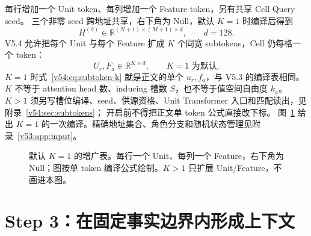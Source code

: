 \documentclass[11pt,UTF8,fontset=fandol]{ctexart}
\numberwithin{equation}{section}
\theoremstyle{definition}
\newcommand{\R}{\mathbb R}
\begin{document}
每行增加一个 Unit token、每列增加一个 Feature token，另有共享 Cell Query seed。
三个非零 seed 跨地址共享，右下角为 Null，默认 $K=1$ 时编译后得到
\begin{equation}
 \boxed{H^{(0)}\in\R^{(N+1)\times(M+1)\times d},\qquad d=128.}
 \label{v53:eq:table-shape}
\end{equation}
V5.4 允许把每个 Unit 与每个 Feature 扩成 $K$ 个同宽 subtokens，Cell 仍每格一个 token：
\begin{equation}
 U_r,F_a\in\R^{K\times d},\qquad K=1\text{ 为默认}.
 \label{v54:eq:subtoken-k}
\end{equation}
$K=1$ 时式~\eqref{v54:eq:subtoken-k} 就是正文的单个 $u_r,f_a$，与 V5.3 的编译表相同。
$K$ 不等于 attention head 数、inducing 槽数 $S$，也不等于值空间自由度 $k_a$。
$K>1$ 须另写槽位编译、seed、供源资格、Unit Transformer 入口和匹配读出，见附录~\ref{v54:sec:subtokens}；
开启前不得把正文单 token 公式直接改下标。
图~\ref{fig:compiler} 给出 $K=1$ 的一次编译。精确地址集合、角色分支和随机状态管理见附录~\ref{v53:app:input}。

\begin{figure}[htbp]\centering
{}
\caption{默认 $K=1$ 的增广表。每行一个 Unit、每列一个 Feature，右下角为 Null；图按单 token 编译公式绘制。$K>1$ 只扩展 Unit/Feature，不画进本图。}
\label{fig:compiler}\end{figure}



\section{Step 3：在固定事实边界内形成上下文}
\label{front:sec:step3}
\end{document}

